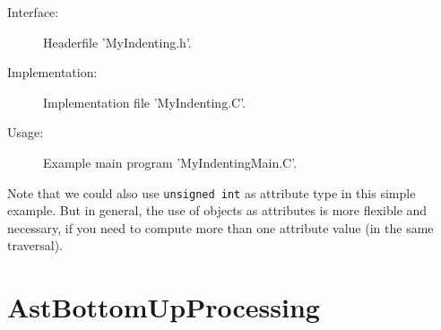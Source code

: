 Interface:

\begin{figure}
\begin{latexonly}
   
\end{latexonly}

\begin{htmlonly}
   
\end{htmlonly}
\caption{Headerfile 'MyIndenting.h'.}
\label{AstProcessing:myvisitor1}
\end{figure}

Implementation:

\begin{figure}
\begin{latexonly}
   
\end{latexonly}

\begin{htmlonly}
   
\end{htmlonly}
\caption{Implementation file 'MyIndenting.C'.}
\label{AstProcessing:myvisitor1}
\end{figure}

Usage:

\begin{figure}
\begin{latexonly}
   
\end{latexonly}

\begin{htmlonly}
   
\end{htmlonly}
\caption{Example main program 'MyIndentingMain.C'.}
\label{AstProcessing:myvisitor1}
\end{figure}

Note that we could also use {\tt unsigned int} as attribute type in this simple example. But in general, the use of objects as attributes is more flexible and necessary, if you need to compute more than one attribute value (in the same traversal).


\section{AstBottomUpProcessing}
\label{AstProcessing:AstBottomUpProcessing}

